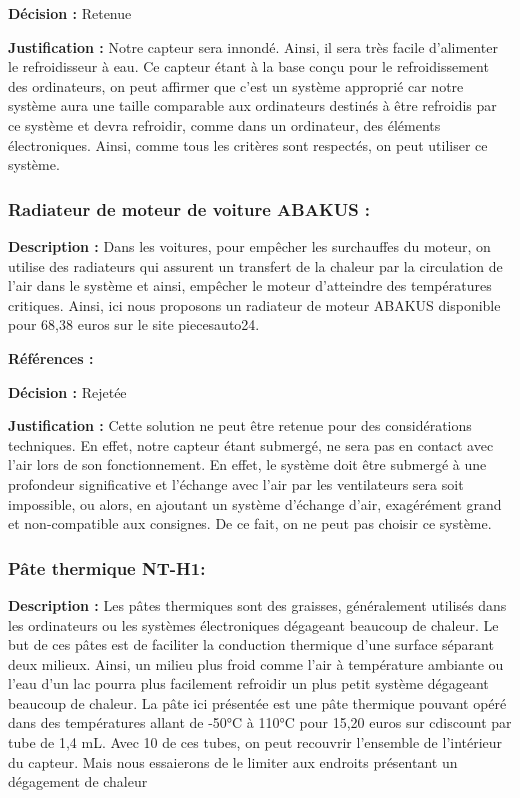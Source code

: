 \textbf{Décision :} Retenue

\textbf{Justification :} Notre capteur sera innondé. Ainsi, il sera très facile d'alimenter le refroidisseur à eau. Ce capteur étant à la base conçu pour le refroidissement des ordinateurs, on peut affirmer que c'est un système approprié car notre système aura une taille comparable aux ordinateurs destinés à être refroidis par ce système et devra refroidir, comme dans un ordinateur, des éléments électroniques. Ainsi, comme tous les critères sont respectés, on peut utiliser ce système.

\subsubsection{Radiateur de moteur de voiture ABAKUS :}
\textbf{Description :} Dans les voitures, pour empêcher les surchauffes du moteur, on utilise des radiateurs qui assurent un transfert de la chaleur par la circulation de l'air dans le système et ainsi, empêcher le moteur d'atteindre des températures critiques. Ainsi, ici nous proposons un radiateur de moteur ABAKUS disponible pour 68,38 euros sur le site piecesauto24.

\textbf{Références :} \cite{rad1} \cite{rad2}

\textbf{Décision :} Rejetée

\textbf{Justification :} Cette solution ne peut être retenue pour des considérations techniques. En effet, notre capteur étant submergé, ne sera pas en contact avec l'air lors de son fonctionnement. En effet, le système doit être submergé à une profondeur significative et l'échange avec l'air par les ventilateurs sera soit impossible, ou alors, en ajoutant un système d'échange d'air, exagérément grand et non-compatible aux consignes. De ce fait, on ne peut pas choisir ce système.

\subsubsection{Pâte thermique NT-H1:}
\textbf{Description :} Les pâtes thermiques sont des graisses, généralement utilisés dans les ordinateurs ou les systèmes électroniques dégageant beaucoup de chaleur. Le but de ces pâtes est de faciliter la conduction thermique d'une surface séparant deux milieux. Ainsi, un milieu plus froid comme l'air à température ambiante ou l'eau d'un lac pourra plus facilement refroidir un plus petit système dégageant beaucoup de chaleur. La pâte ici présentée est une pâte thermique pouvant opéré dans des températures allant de -50°C à 110°C pour 15,20 euros sur cdiscount par tube de 1,4 mL. Avec 10 de ces tubes, on peut recouvrir l'ensemble de l'intérieur du capteur. Mais nous essaierons de le limiter aux endroits présentant un dégagement de chaleur

